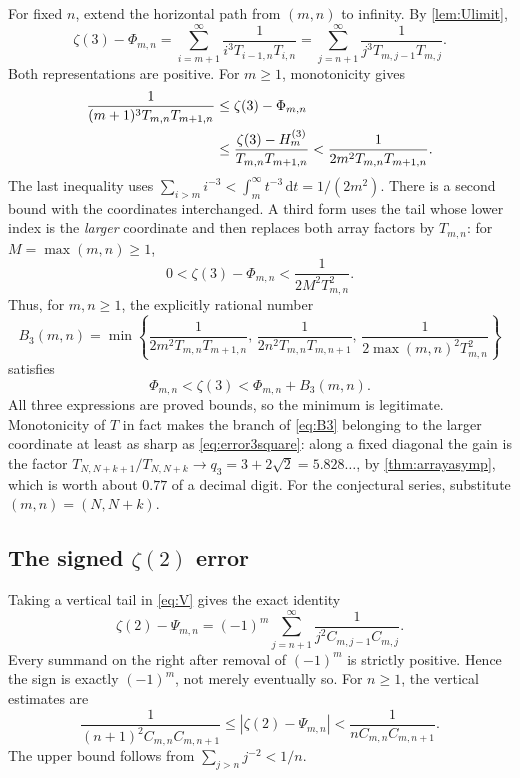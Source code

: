 \documentclass[11pt,letterpaper]{article}
\numberwithin{equation}{section}
\theoremstyle{definition}
\newcommand{\Hh}[2]{H_{#1}^{(#2)}}
\newcommand{\dd}{\mathrm d}
\newcommand{\zthree}{\zeta(3)}
\newcommand{\ztwo}{\zeta(2)}
\begin{document}
For fixed $n$, extend the horizontal path from $(m,n)$ to infinity.
By \cref{lem:Ulimit},
\begin{equation}\label{eq:error3exact}
 \zthree-\Phi_{m,n}
 =\sum_{i=m+1}^{\infty}\frac1{i^3T_{i-1,n}T_{i,n}}
 =\sum_{j=n+1}^{\infty}\frac1{j^3T_{m,j-1}T_{m,j}}.
\end{equation}
Both representations are positive. For $m\geq1$, monotonicity gives
\begin{align}
 \frac1{(m+1)^3T_{m,n}T_{m+1,n}}
 &\leq\zthree-\Phi_{m,n}\notag\\
 &\leq\frac{\zthree-\Hh{m}{3}}{T_{m,n}T_{m+1,n}}
 <\frac1{2m^2T_{m,n}T_{m+1,n}}.\label{eq:error3bound}
\end{align}
The last inequality uses
$\sum_{i>m}i^{-3}<\int_m^{\infty}t^{-3}\,\dd t=1/(2m^2)$.
There is a second bound with the coordinates interchanged. A third form
uses the tail whose lower index is the \emph{larger} coordinate and then
replaces both array factors by $T_{m,n}$: for $M=\max(m,n)\geq1$,
\begin{equation}\label{eq:error3square}
 0<\zthree-\Phi_{m,n}<\frac1{2M^2T_{m,n}^2}.
\end{equation}
Thus, for $m,n\geq1$, the explicitly rational number
\begin{equation}\label{eq:B3}
 B_3(m,n)=\min\left\{
 \frac1{2m^2T_{m,n}T_{m+1,n}},\,
 \frac1{2n^2T_{m,n}T_{m,n+1}},\,
 \frac1{2\max(m,n)^2T_{m,n}^2}\right\}
\end{equation}
satisfies
\[
 \Phi_{m,n}<\zthree<\Phi_{m,n}+B_3(m,n).
\]
All three expressions are proved bounds, so the minimum is legitimate.
Monotonicity of $T$ in fact makes the branch of \eqref{eq:B3} belonging
to the larger coordinate at least as sharp as \eqref{eq:error3square}:
along a fixed diagonal the gain is the factor
$T_{N,N+k+1}/T_{N,N+k}\to q_3=3+2\sqrt2=5.828\ldots$, by
\cref{thm:arrayasymp}, which is worth about $0.77$ of a decimal digit.
For the conjectural series, substitute $(m,n)=(N,N+k)$.

\subsection{The signed \texorpdfstring{$\zeta(2)$}{zeta(2)} error}

Taking a vertical tail in \eqref{eq:V} gives the exact identity
\begin{equation}\label{eq:error2exact}
 \ztwo-\Psi_{m,n}=(-1)^m
 \sum_{j=n+1}^{\infty}\frac1{j^2C_{m,j-1}C_{m,j}}.
\end{equation}
Every summand on the right after removal of $(-1)^m$ is strictly
positive. Hence the sign is exactly $(-1)^m$, not merely eventually so.
For $n\geq1$, the vertical estimates are
\begin{equation}\label{eq:error2vertical}
 \frac1{(n+1)^2C_{m,n}C_{m,n+1}}
 \leq |\ztwo-\Psi_{m,n}|
 <\frac1{nC_{m,n}C_{m,n+1}}.
\end{equation}
The upper bound follows from $\sum_{j>n}j^{-2}<1/n$.
\end{document}

